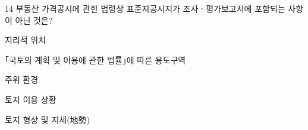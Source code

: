 \begin{question}{14}
부동산 가격공시에 관한 법령상 표준지공시지가 조사ㆍ평가보고서에 포함되는 사항이 아닌 것은?
\begin{choices}
  \item 지리적 위치
  \item ｢국토의 계획 및 이용에 관한 법률｣에 따른 용도구역
  \item 주위 환경
  \item 토지 이용 상황
  \item 토지 형상 및 지세(地勢)
\end{choices}
\end{question}
